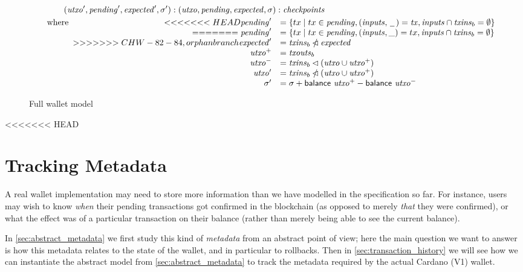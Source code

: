 \documentclass{article}
\newcommand{\restrictdom}{\lhd}
\newcommand{\subtractdom}{\mathbin{\slashed{\restrictdom}}}
\theoremstyle{definition}{
  \newtheorem{lemma}{Lemma}[section] %
  \newtheorem{definition}[lemma]{Definition}
}
\theoremstyle{theorem}{
  \newtheorem{invariant}[lemma]{Invariant}
  \newtheorem{proofobligation}[lemma]{Proof Obligation}
}
\numberwithin{equation}{lemma}
\begin{document}
\begin{figure}
\begin{align*}
& \qquad\qquad (\mathit{utxo}', \mathit{pending}', \mathit{expected}', \sigma') : (\mathit{utxo}, \mathit{pending}, \mathit{expected}, \sigma) : \mathit{checkpoints} \\
& \qquad \text{where}
   \begin{array}[t]{rl}
<<<<<<< HEAD
     \mathit{pending}'  & = \{ tx \mid tx \in \mathit{pending}, (\mathit{inputs}, \,\underline{\phantom{a}}\,) = \mathit{tx}, \mathit{inputs} \cap \mathit{txins}_b = \emptyset \} \\
=======
     \mathit{pending}'  & = \{ tx \mid tx \in \mathit{pending}, (\mathit{inputs}, \_) = tx, \mathit{inputs} \cap \mathit{txins}_b = \emptyset \} \\
>>>>>>> CHW-82-84, orphan branch
     \mathit{expected}' & = \mathit{txins}_b \subtractdom \mathit{expected} \\
     \mathit{utxo}^+    & = \mathit{txouts}_b \\
     \mathit{utxo}^-    & = \mathit{txins}_b \restrictdom (\mathit{utxo} \cup \mathit{utxo}^+) \\
     \mathit{utxo}'     & = \mathit{txins}_b \subtractdom (\mathit{utxo} \cup \mathit{utxo}^+) \\
     \sigma'            & = \sigma + \mathsf{balance} ~ \mathit{utxo}^+ - \mathsf{balance} ~ \mathit{utxo}^-
   \end{array}
\end{align*}

\caption{\label{fig:full_wallet_model}Full wallet model}
\end{figure}

<<<<<<< HEAD
\section{Tracking Metadata}

A real wallet implementation may need to store more information than
we have modelled in the specification so far. For instance, users may wish to
know \emph{when} their pending transactions got confirmed in the blockchain
(as opposed to merely \emph{that} they were confirmed), or what the effect
was of a particular transaction on their balance (rather than merely being
able to see the current balance).

In \cref{sec:abstract_metadata} we first study this kind of \emph{metadata}
from an abstract point of view; here the main question we want to answer is
how this metadata relates to the state of the wallet, and in particular to
rollbacks. Then in \cref{sec:transaction_history} we will see how
we can instantiate the abstract model from \cref{sec:abstract_metadata}
to track the metadata required by the actual Cardano (V1) wallet.
\end{document}

